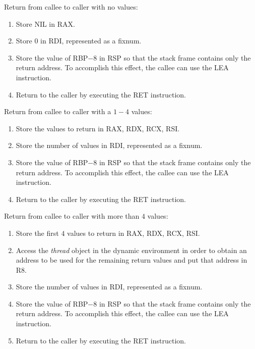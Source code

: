 Return from callee to caller with no values:

\begin{enumerate}
\item Store NIL in RAX.
\item Store $0$ in RDI, represented as a fixnum.
\item Store the value of RBP$ - 8$ in RSP so that the stack frame
  contains only the return address.  To accomplish this effect, the
  callee can use the LEA instruction. 
\item Return to the caller by executing the RET instruction. 
\end{enumerate}

Return from callee to caller with a $1 - 4$ values:

\begin{enumerate}
\item Store the values to return in RAX, RDX, RCX, RSI.
\item Store the number of values in RDI, represented as a fixnum.
\item Store the value of RBP$ - 8$ in RSP so that the stack frame
  contains only the return address.  To accomplish this effect, the
  callee can use the LEA instruction. 
\item Return to the caller by executing the RET instruction. 
\end{enumerate}

Return from callee to caller with more than $4$ values:

\begin{enumerate}
\item Store the first $4$ values to return in RAX, RDX, RCX, RSI.
\item Access the \emph{thread} object in the dynamic environment in
  order to obtain an address to be used for the remaining return
  values and put that address in R8.
\item Store the number of values in RDI, represented as a fixnum.
\item Store the value of RBP$ - 8$ in RSP so that the stack frame
  contains only the return address.  To accomplish this effect, the
  callee can use the LEA instruction. 
\item Return to the caller by executing the RET instruction. 
\end{enumerate}
